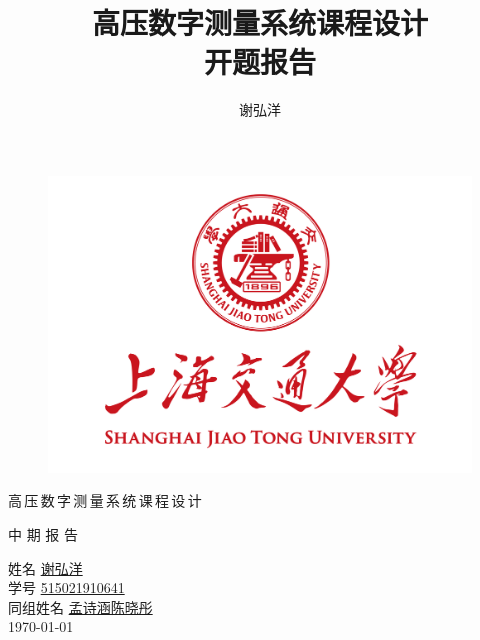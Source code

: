 \documentclass[a4paper,11pt]{ctexart}
\title
{
	\linespread{1.5} \zihao{4}
	高压数字测量系统课程设计 \\ 
	\zihao{2}
	开题报告
}
\author
{
	谢弘洋
}
\date{}
\newcommand{\AuthorX}
{
	
	\zihao{-3}
	\hspace{2em}姓名\hspace{1em} \underline{\hspace{4em}谢弘洋\hspace{4em}}\\
	\vspace{1em}
	\hspace{2em}学号\hspace{1em} \underline{\hspace{2.5em}515021910641\hspace{2.5em}}\\
	\vspace{1em}
	同组姓名\hspace{1em} \underline{\hspace{2em}孟诗涵\hspace{1em}陈晓彤\hspace{2em}}\\
}
\begin{document}
	\pagestyle{plain}

\begin{figure}[t]
	\setlength{\abovecaptionskip}{-10mm}
	\setlength{\belowcaptionskip}{-60mm}
	\centering
	\includegraphics[scale=0.4]{page1.png}
\end{figure}

\begin{center}
	高\,压\,数\,字\,测\,量\,系\,统\,课\,程\,设\,计 \\
	\vspace{0.7em}
	
	中\hspace{0.5em} 期\hspace{0.5em} 报\hspace{0.5em} 告\\
	\vspace{3em}
		
	\AuthorX
	
	\vspace{6em}
	\today
\end{center}
\end{document}
